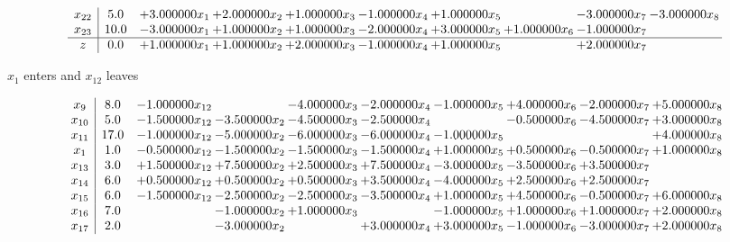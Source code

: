 \documentclass[10pt]{article}
\begin{document}
\[\begin{array}{c| c c@{\hskip 2pt} c@{\hskip 2pt} c@{\hskip 2pt} c@{\hskip 2pt} c@{\hskip 2pt} c@{\hskip 2pt} c@{\hskip 2pt} c@{\hskip 2pt} }
 x_{22}   &  5.0 & + 3.000000 x_{1} & + 2.000000 x_{2} & + 1.000000 x_{3} & -1.000000 x_{4} & + 1.000000 x_{5} &   & -3.000000 x_{7} & -3.000000 x_{8}\\
 x_{23}   &  10.0 & -3.000000 x_{1} & + 1.000000 x_{2} & + 1.000000 x_{3} & -2.000000 x_{4} & + 3.000000 x_{5} & + 1.000000 x_{6} & -1.000000 x_{7} &   \\
\hline
z    &  0.0 & + 1.000000 x_{1} & + 1.000000 x_{2} & + 2.000000 x_{3} & -1.000000 x_{4} & + 1.000000 x_{5} &   & + 2.000000 x_{7} &   \\
\end{array}\]


 $ x_{1} $ enters and $ x_{12} $ leaves 

 \[\begin{array}{c| c c@{\hskip 2pt} c@{\hskip 2pt} c@{\hskip 2pt} c@{\hskip 2pt} c@{\hskip 2pt} c@{\hskip 2pt} c@{\hskip 2pt} c@{\hskip 2pt} }
 x_{9}   &  8.0 & -1.000000 x_{12} &   & -4.000000 x_{3} & -2.000000 x_{4} & -1.000000 x_{5} & + 4.000000 x_{6} & -2.000000 x_{7} & + 5.000000 x_{8}\\
 x_{10}   &  5.0 & -1.500000 x_{12} & -3.500000 x_{2} & -4.500000 x_{3} & -2.500000 x_{4} &   & -0.500000 x_{6} & -4.500000 x_{7} & + 3.000000 x_{8}\\
 x_{11}   &  17.0 & -1.000000 x_{12} & -5.000000 x_{2} & -6.000000 x_{3} & -6.000000 x_{4} & -1.000000 x_{5} &    &   & + 4.000000 x_{8}\\
 x_{1}   &  1.0 & -0.500000 x_{12} & -1.500000 x_{2} & -1.500000 x_{3} & -1.500000 x_{4} & + 1.000000 x_{5} & + 0.500000 x_{6} & -0.500000 x_{7} & + 1.000000 x_{8}\\
 x_{13}   &  3.0 & + 1.500000 x_{12} & + 7.500000 x_{2} & + 2.500000 x_{3} & + 7.500000 x_{4} & -3.000000 x_{5} & -3.500000 x_{6} & + 3.500000 x_{7} &   \\
 x_{14}   &  6.0 & + 0.500000 x_{12} & + 0.500000 x_{2} & + 0.500000 x_{3} & + 3.500000 x_{4} & -4.000000 x_{5} & + 2.500000 x_{6} & + 2.500000 x_{7} &   \\
 x_{15}   &  6.0 & -1.500000 x_{12} & -2.500000 x_{2} & -2.500000 x_{3} & -3.500000 x_{4} & + 1.000000 x_{5} & + 4.500000 x_{6} & -0.500000 x_{7} & + 6.000000 x_{8}\\
 x_{16}   &  7.0  &   & -1.000000 x_{2} & + 1.000000 x_{3} &   & -1.000000 x_{5} & + 1.000000 x_{6} & + 1.000000 x_{7} & + 2.000000 x_{8}\\
 x_{17}   &  2.0  &   & -3.000000 x_{2} &   & + 3.000000 x_{4} & + 3.000000 x_{5} & -1.000000 x_{6} & -3.000000 x_{7} & + 2.000000 x_{8}\\

\end{array}\]
\end{document}
